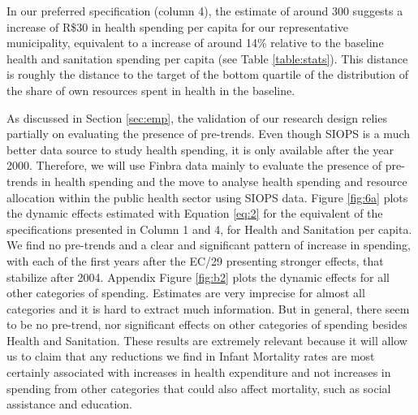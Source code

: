 In our preferred specification (column 4), the estimate of around 300 suggests a increase of R\$30 in health spending per capita for our representative municipality, equivalent to a increase of around 14\% relative to the baseline health and sanitation spending per capita (see Table \ref{table:stats}). This distance is roughly the distance to the target of the bottom quartile of the distribution of the share of own resources spent in health in the baseline.

As discussed in Section \ref{sec:emp}, the validation of our research design relies partially on evaluating the presence of pre-trends. Even though SIOPS is a much better data source to study health spending, it is only available after the year 2000. Therefore, we will use Finbra data mainly to evaluate the presence of pre-trends in health spending and the move to analyse health spending and resource allocation within the public health sector using SIOPS data. Figure \ref{fig:6a} plots the dynamic effects estimated with Equation \ref{eq:2} for the equivalent of the specifications presented in Column 1 and 4, for Health and Sanitation per capita. We find no pre-trends and a clear and significant pattern of increase in spending, with each of the first years after the EC/29 presenting stronger effects, that stabilize after 2004. Appendix Figure \ref{fig:b2} plots the dynamic effects for all other categories of spending. Estimates are very imprecise for almost all categories and it is hard to extract much information. But in general, there seem to be no pre-trend, nor significant effects on other categories of spending besides Health and Sanitation. These results are extremely relevant because it will allow us to claim that any reductions we find in Infant Mortality rates are most certainly associated with increases in health expenditure and not increases in spending from other categories that could also affect mortality, such as social assistance and education. 







